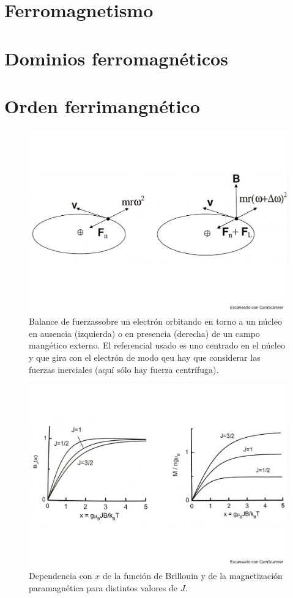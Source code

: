 \section{Ferromagnetismo}

\section{Dominios ferromagnéticos}

\section{Orden ferrimangnético}

\begin{figure}[h!] \centering
	\includegraphics[scale=0.35]{Cuerpo/Ch_10/Fotos libro 1.pdf}
	\caption{Balance  de fuerzassobre un electrón orbitando en torno a un núcleo en ausencia (izquierda) o en presencia (derecha) de un campo mangético externo. El referencial usado es uno centrado en el núcleo y que gira con el electrón de modo qeu hay que considerar las fuerzas inerciales (aquí sólo hay fuerza centrífuga).}
	\label{Fig:10-01}
\end{figure}
\begin{figure}[h!] \centering
	\includegraphics[scale=0.35]{Cuerpo/Ch_10/Fotos libro 2.pdf}
	\caption{Dependencia con $x$ de la función de Brillouin y de la magnetización paramagnética para distintos valores de $J$.}
	\label{Fig:10-02}
\end{figure}
